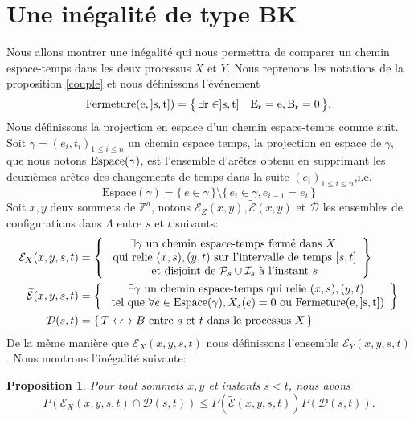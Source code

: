 \documentclass[titlepage,a4paper,12pt]{article}
\newcounter{th}
\newcounter{propo}
\newtheorem{prop}[propo]{Proposition}
\begin{document}
\section{Une inégalité de type BK}
Nous allons montrer une inégalité qui nous permettra de comparer un chemin espace-temps dans les deux processus $X$ et $Y$. Nous reprenons les notations de la proposition \ref{couple} et nous définissons l'événement $$ \rm{Fermeture}(e,]s,t]) = \big\{\, \exists r \in ]s,t] \quad E_r = e,B_r = 0\,\big\}.
$$
Nous définissons la projection en espace d'un chemin espace-temps comme suit. Soit $\gamma = (e_i,t_i)_{1\leqslant i \leqslant n}$ un chemin espace temps, la projection en espace de $\gamma$, que nous notons $\rm{Espace}(\gamma)$, est l'ensemble d'arêtes obtenu en supprimant les deuxièmes arêtes des changements de temps dans la suite $(e_i)_{1\leqslant i \leqslant n}$,i.e.
$$\mathrm{Espace}(\gamma) = \{\,e\in \gamma\,\} \setminus \{\,e_i\in \gamma, e_{i-1} = e_i\,\}
$$
Soit $x,y$ deux sommets de $\mathbb{Z}^d$, notons $\mathcal{E}_Z(x,y),\widetilde{\mathcal{E}}(x,y)$ et $\mathcal{D}$ les ensembles de configurations dans $\Lambda$ entre $s$ et $t$ suivants:
\begin{align*}
\mathcal{E}_X(x,y,s,t)&=\left\lbrace\begin{array}{c}\exists \gamma
\text{ un chemin espace-temps fermé dans }X\\\text{ qui relie }(x,s),(y,t)\text{ sur l'intervalle de temps } [s ,t]\\\text{ et disjoint de }\mathcal{P}_s\cup \mathcal{I}_s \text{ à l'instant }s
\end{array} \right\rbrace\\
\widetilde{\mathcal{E}}(x,y,s,t)&=\left\lbrace \begin{array}{c}
 \exists\gamma\text{ un chemin espace-temps qui relie } (x,s),(y,t)\\ \text{ tel que }\forall e \in \mathrm{Espace}(\gamma), X_s(e) = 0 \text{ ou } \rm{Fermeture}(e,]s,t]) 
\end{array}\right\rbrace\\
\mathcal{D}(s,t)& = \{\,T\longarrownot\longleftrightarrow B \text{ entre }s \text{ et }t\text{ dans le processus }X\,\}
\end{align*}
De la même manière que $\mathcal{E}_X(x,y,s,t)$ nous définissons l'ensemble $\mathcal{E}_Y(x,y,s,t)$.
Nous montrons l'inégalité suivante:
\begin{prop} \label{BK'} Pour tout sommets $x,y$ et instants $s<t$, nous avons
$$P\left(\mathcal{E}_X(x,y,s,t)\cap\mathcal{D}(s,t)\right)\leqslant P\left(\widetilde{\mathcal{E}}(x,y,s,t)\right)P\left(\mathcal{D}(s,t)\right).$$
\end{prop}
\end{document}

